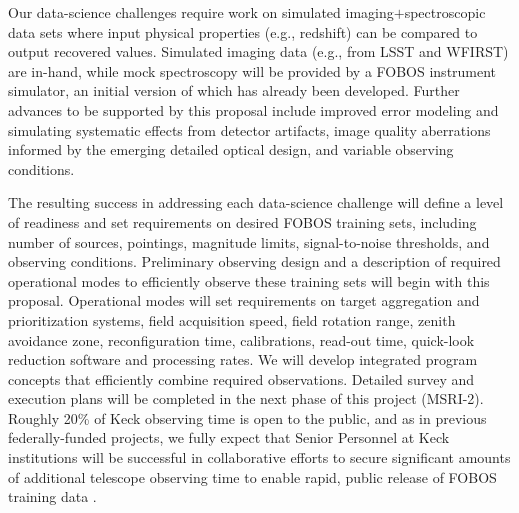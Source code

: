 \documentclass[oneside,11pt]{amsart}
\begin{document}
Our data-science challenges require work on simulated
imaging$+$spectroscopic data sets where input physical properties (e.g.,
redshift) can be compared to output recovered values.  Simulated imaging
data (e.g., from LSST and WFIRST) are in-hand, while mock spectroscopy
will be provided by a FOBOS instrument simulator, an initial version of
which has already been developed.  Further advances to be supported by
this proposal include improved error modeling and simulating systematic
effects from detector artifacts, image quality aberrations informed by
the emerging detailed optical design, and variable observing conditions.

The resulting success in addressing each data-science challenge will
define a level of readiness and set requirements on desired FOBOS
training sets, including number of sources, pointings, magnitude limits,
signal-to-noise thresholds, and observing conditions.  Preliminary
observing design and a description of required operational modes to
efficiently observe these training sets will begin with this proposal.
Operational modes will set requirements on target aggregation and
prioritization systems, field acquisition speed, field rotation range,
zenith avoidance zone, reconfiguration time, calibrations, read-out
time, quick-look reduction software and processing rates.  We will
develop integrated program concepts that efficiently combine required
observations.  Detailed survey and execution plans will be completed in
the next phase of this project (MSRI-2).  Roughly 20\% of Keck observing
time is open to the public, and as in previous federally-funded
projects, we fully expect that Senior Personnel at Keck institutions
will be successful in collaborative efforts to secure significant
amounts of additional telescope observing time to enable rapid, public
release of FOBOS training data \citep[e.g.,][]{newman13}.

\end{document}
